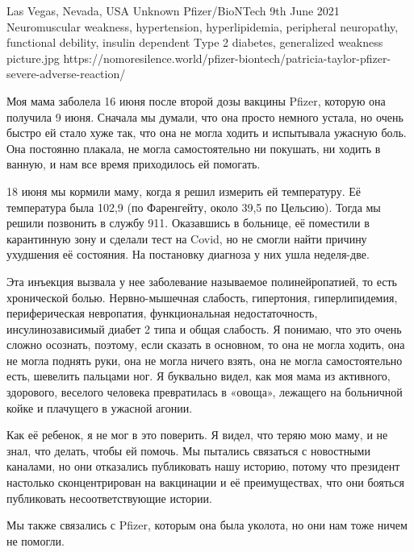 {Las Vegas, Nevada, USA}
{Unknown}
{Pfizer/BioNTech}
{9th June 2021}
{Neuromuscular weakness, hypertension, hyperlipidemia, peripheral neuropathy, functional debility, insulin dependent Type 2 diabetes, generalized weakness}
{picture.jpg}
{https://nomoresilence.world/pfizer-biontech/patricia-taylor-pfizer-severe-adverse-reaction/}
{

Моя мама заболела 16 июня после второй дозы вакцины Pfizer, которую она получила
9 июня. Сначала мы думали, что она просто немного устала, но очень быстро ей
стало хуже так, что она не могла ходить и испытывала ужасную боль. Она постоянно
плакала, не могла самостоятельно ни покушать, ни ходить в ванную, и нам все
время приходилось ей помогать.

18 июня мы кормили маму, когда я решил измерить ей температуру. Её температура
была 102,9 (по Фаренгейту, около 39,5 по Цельсию). Тогда мы решили позвонить в
службу 911. Оказавшись в больнице, её поместили в карантинную зону и сделали
тест на Covid, но не смогли найти причину ухудшения её состояния. На постановку
диагноза у них ушла неделя-две.

Эта инъекция вызвала у нее заболевание называемое полинейропатией, то есть
хронической болью. Нервно-мышечная слабость, гипертония, гиперлипидемия,
периферическая невропатия, функциональная недостаточность, инсулинозависимый
диабет 2 типа и общая слабость. Я понимаю, что это очень сложно осознать,
поэтому, если сказать в основном, то она не могла ходить, она не могла поднять
руки, она не могла ничего взять, она не могла самостоятельно есть, шевелить
пальцами ног. Я буквально видел, как моя мама из активного, здорового, веселого
человека превратилась в «овоща», лежащего на больничной койке и плачущего в
ужасной агонии.

Как её ребенок, я не мог в это поверить. Я видел, что теряю мою маму, и не знал,
что делать, чтобы ей помочь. Мы пытались связаться с новостными каналами, но они
отказались публиковать нашу историю, потому что президент настолько
сконцентрирован на вакцинации и её преимуществах, что они бояться публиковать
несоответствующие истории.

Мы также связались с Pfizer, которым она была уколота, но они нам тоже ничем не
помогли.

}
